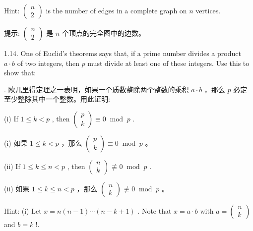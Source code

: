 \documentclass[10pt]{article}
\begin{document}
Hint: \(\left( \begin{array}{l} n \\  2 \end{array}\right)\) is the number of edges in a complete graph on \(n\) vertices.

\begin{tcolorbox}\relax
提示: \(\left( \begin{array}{l} n \\  2 \end{array}\right)\) 是 \(n\) 个顶点的完全图中的边数。
\end{tcolorbox}

1.14. One of Euclid's theorems says that, if a prime number divides a product \(a \cdot  b\) of two integers, then \(p\) must divide at least one of these integers. Use this to show that:

\begin{tcolorbox}. 欧几里得定理之一表明，如果一个质数整除两个整数的乘积 \(a \cdot  b\) ，那么 \(p\) 必定至少整除其中一个整数。用此证明:
\end{tcolorbox}

(i) If \(1 \leq  k < p\) , then \(\left( \begin{array}{l} p \\  k \end{array}\right)  \equiv  0{\;\operatorname{mod}\;p}\) .

\begin{tcolorbox}\relax
(i) 如果 \(1 \leq  k < p\) ，那么 \(\left( \begin{array}{l} p \\  k \end{array}\right)  \equiv  0{\;\operatorname{mod}\;p}\) 。
\end{tcolorbox}

(ii) If \(1 \leq  k \leq  n < p\) , then \(\left( \begin{array}{l} n \\  k \end{array}\right)  \text{ ≢ } 0{\;\operatorname{mod}\;p}\) .

\begin{tcolorbox}\relax
(ii) 如果 \(1 \leq  k \leq  n < p\) ，那么 \(\left( \begin{array}{l} n \\  k \end{array}\right)  \text{ ≢ } 0{\;\operatorname{mod}\;p}\) 。
\end{tcolorbox}

Hint: (i) Let \(x = n\left( {n - 1}\right) \cdots \left( {n - k + 1}\right)\) . Note that \(x = a \cdot  b\) with \(a = \left( \begin{array}{l} n \\  k \end{array}\right)\) and \(b = k\) !.
\end{document}
